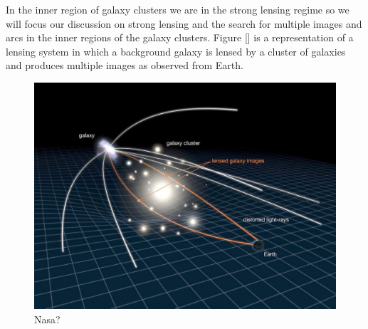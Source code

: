 In the inner region of galaxy clusters we are in the strong lensing regime so we will focus our discussion on strong lensing and the search for multiple images and arcs in the inner regions of the galaxy clusters. Figure [] is a representation of a lensing system in which a background galaxy is lensed by a cluster of galaxies and produces multiple images as observed from Earth. 

\begin{figure}[H]
\centering
\includegraphics[width=12cm]{images/strong_lensing.jpg}
\caption[Strong Lensing representation]{Nasa?}
\end{figure}




